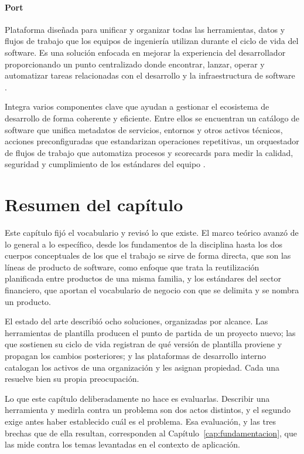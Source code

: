 \paragraph*{Port}
Plataforma diseñada para unificar y organizar todas las herramientas, datos y flujos de trabajo que los equipos de ingeniería utilizan durante el ciclo de vida del software. Es una solución enfocada en mejorar la experiencia del desarrollador proporcionando un punto centralizado donde encontrar, lanzar, operar y automatizar tareas relacionadas con el desarrollo y la infraestructura de software \citep{port-platform-2026}.

Integra varios componentes clave que ayudan a gestionar el ecosistema de desarrollo de forma coherente y eficiente. Entre ellos se encuentran un catálogo de software que unifica metadatos de servicios, entornos y otros activos técnicos, acciones preconfiguradas que estandarizan operaciones repetitivas, un orquestador de flujos de trabajo que automatiza procesos y scorecards para medir la calidad, seguridad y cumplimiento de los estándares del equipo \citep{port-platform-2026}.

\section{Resumen del capítulo}

Este capítulo fijó el vocabulario y revisó lo que existe. El marco teórico
avanzó de lo general a lo específico, desde los fundamentos de la disciplina
hasta los dos cuerpos conceptuales de los que el trabajo se sirve de forma
directa, que son las líneas de producto de software, como enfoque que trata
la reutilización planificada entre productos de una misma familia, y los
estándares del sector financiero, que aportan el vocabulario de negocio con
que se delimita y se nombra un producto.

El estado del arte describió ocho soluciones, organizadas por alcance. Las
herramientas de plantilla producen el punto de partida de un proyecto nuevo;
las que sostienen su ciclo de vida registran de qué versión de plantilla
proviene y propagan los cambios posteriores; y las plataformas de desarrollo
interno catalogan los activos de una organización y les asignan propiedad.
Cada una resuelve bien su propia preocupación.

Lo que este capítulo deliberadamente no hace es evaluarlas. Describir una
herramienta y medirla contra un problema son dos actos distintos, y el
segundo exige antes haber establecido cuál es el problema. Esa evaluación, y
las tres brechas que de ella resultan, corresponden al
Capítulo~\ref{cap:fundamentacion}, que las mide contra los temas
levantadas en el contexto de aplicación.